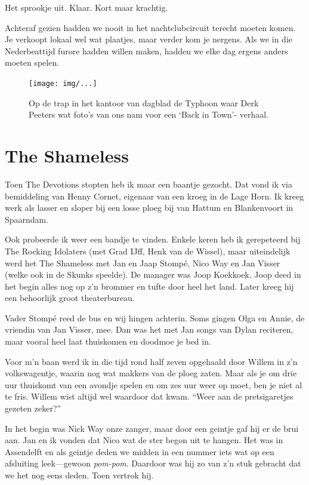 \documentclass[12pt,twoside]{memoir}
\begin{document}
Het sprookje uit. Klaar. Kort maar krachtig.

Achteraf gezien hadden we nooit in het nachtclubcircuit terecht moeten komen. Je verkoopt lokaal wel wat plaatjes, maar verder kom je nergens. Als we in die Nederbeattijd furore hadden willen maken, hadden we elke dag ergens anders moeten spelen.

\begin{figure}[t]
\texttt{[image: img/...]}
\caption{Op de trap in het kantoor van dagblad de Typhoon waar Derk Peeters wat foto’s van ons nam voor een `Back in Town'- verhaal.}
\end{figure}


\chapter{The Shameless} %
\label{cha:shameless}

Toen The Devotions stopten heb ik maar een baantje gezocht. Dat vond ik via bemiddeling van Henny Cornet, eigenaar van een kroeg in de Lage Horn. Ik kreeg werk als lasser en sloper bij een losse ploeg bij van Hattum en Blankenvoort in Spaarndam.

Ook probeerde ik weer een bandje te vinden. Enkele keren heb ik gerepeteerd bij The Rocking Idolaters (met Grad IJff, Henk van de Wissel), maar uiteindelijk werd het The Shameless met Jan en Jaap Stompé, Nico Way en Jan Visser (welke ook in de Skunks speelde). De manager was Joop Koekkoek. Joop deed in het begin alles nog op z’n brommer en tufte door heel het land. Later kreeg hij een behoorlijk groot theaterbureau. 

Vader Stompé reed de bus en wij hingen achterin. Soms gingen Olga en Annie, de vriendin van Jan Visser, mee. Dan was het met Jan songs van Dylan reciteren, maar vooral heel laat thuiskomen en doodmoe je bed in.

Voor m'n baan werd ik in die tijd rond half zeven opgehaald door Willem in z’n volkswagentje, waarin nog wat makkers van de ploeg zaten. Maar als je om drie uur thuiskomt van een avondje spelen en om zes uur weer op moet, ben je niet al te fris. Willem wist altijd wel waardoor dat kwam. ``Weer aan de pretsigaretjes gezeten zeker?''

In het begin was Nick Way onze zanger, maar door een geintje gaf hij er de brui aan. Jan en ik  vonden dat Nico wat de ster begon uit te hangen. Het was in Assendelft en als geintje deden we midden in een nummer iets wat op een afsluiting leek---gewoon \emph{pom-pom}. Daardoor was hij zo van z’n stuk gebracht dat we het nog eens deden. Toen vertrok hij.
\end{document}

